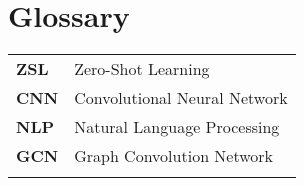 

\chapter{Glossary}

\begin{flushleft}

    \begin{tabular}{  l  l   }
    \vspace{1mm}
    \textbf{ZSL} & Zero-Shot Learning \\ \vspace{1mm}
    \textbf{CNN} & Convolutional Neural Network \\ \vspace{1mm}
    \textbf{NLP} & Natural Language Processing \\ \vspace{1mm}
    \textbf{GCN} & Graph Convolution Network \\ \vspace{1mm}
    \end{tabular}
    
\end{flushleft}

